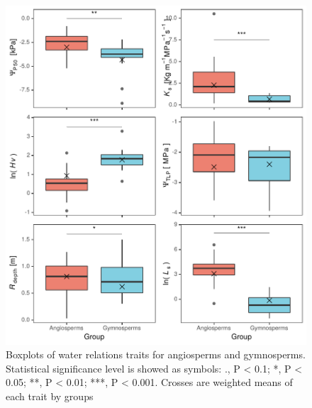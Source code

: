 \documentclass[11pt,twoside]{reedthesis}
\begin{document}
\begin{figure}[H]

{\centering \includegraphics[width=1\linewidth]{figure/appendixD/figanggym} 

}

\caption[Boxplots of water relations traits for angiosperms and gymnosperms.]{Boxplots of water relations traits for angiosperms and gymnosperms. Statistical significance level is showed as symbols: ., P < 0.1; *, P < 0.05; **, P < 0.01; ***, P < 0.001. Crosses are weighted means of each trait by groups}\label{fig:angiogymnoplotsAOVplot}
\end{figure}
\newpage
\end{document}
